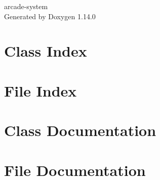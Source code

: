 \documentclass[twoside]{book}
\newcommand{\+}{\discretionary{\mbox{\scriptsize$\hookleftarrow$}}{}{}}
\newcommand{\clearemptydoublepage}{%
    \newpage{\pagestyle{empty}\cleardoublepage}%
  }
\begin{document}
  \raggedbottom
    \hypersetup{pageanchor=false,
                bookmarksnumbered=true,
                pdfencoding=unicode
               }
  \begin{titlepage}
  \vspace*{7cm}
  \begin{center}%
  {\Large arcade-\/system}\\
  \vspace*{1cm}
  {\large Generated by Doxygen 1.14.0}\\
  \end{center}
  \end{titlepage}
  \clearemptydoublepage
  \tableofcontents
  \clearemptydoublepage
  \hypersetup{pageanchor=true}
\chapter{Class Index}

\chapter{File Index}

\chapter{Class Documentation}




\chapter{File Documentation}






























  \backmatter
  \newpage
  \clearemptydoublepage
  \printindex
\end{document}
